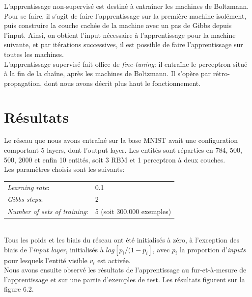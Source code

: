 \documentclass[a4paper,oneside]{report}
\begin{document}
L'apprentissage non-supervisé est destiné à entraîner les machines de Boltzmann. Pour se faire, il s'agit de faire l'apprentissage sur la première machine isolément, puis construire la couche cachée de la machine avec un pas de Gibbs depuis l'input. Ainsi, on obtient l'input nécessaire à l'apprentissage pour la machine suivante, et par itérations successives, il est possible de faire l'apprentissage sur toutes les machines.\\

L'apprentissage supervisé fait office de \textit{fine-tuning}: il entraîne le perceptron situé à la fin de la chaîne, après les machines de Boltzmann. Il s'opère par rétro-propagation, dont nous avons décrit plus haut le fonctionnement.


		\section{Résultats}

	
Le réseau que nous avons entraîné sur la base MNIST avait une configuration comportant 5 layers, dont l'output layer. Les entités sont réparties en 784, 500, 500, 2000 et enfin 10 entités, soit 3 RBM et 1 perceptron à deux couches.\\

Les paramètres choisis sont les suivants:\\

\begin{tabular}{ll}
   \textit{Learning rate}: &0.1\\
	\textit{Gibbs steps}: & 2\\
	\textit{Number of sets of training}:& 5 (soit 300.000 exemples)\\
\end{tabular}\\

Tous les poids et les biais du réseau ont été initialisés à zéro, à l'exception des biais de l'\textit{input layer}, initialisés à \begin{math}log[p_{i}/(1 - p_{i}]\end{math}, avec \begin{math}p_{i}\end{math} la proportion d'\textit{inputs} pour lesquels l'entité visible \begin{math}v_{i}\end{math} est activée.\\

Nous avons ensuite observé les résultats de l'apprentissage au fur-et-à-mesure de l'apprentissage et sur une partie d'exemples de test. Les résultats figurent sur la figure 6.2.
\end{document}
